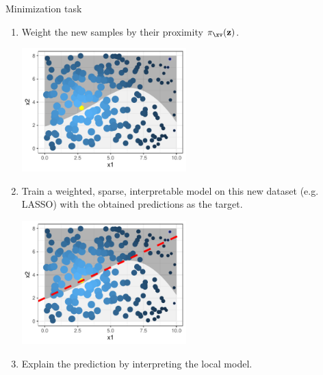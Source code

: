 \documentclass[11pt,compress,t,notes=noshow, xcolor=table]{beamer}
\newcommand{\neigh}{\pi_{\xv}}
\newcommand{\zv}{\mathbf{z}}
\begin{document}
\begin{vbframe}{Minimization task}
\begin{enumerate}
		\framebreak
		\item Weight the new samples by their proximity $\neigh(\zv)$.
			\vspace{1cm}
		\begin{center}
			\includegraphics[width=0.5\textwidth]{figure/lime4}
		\end{center}
		
		\framebreak
		\item Train a weighted, sparse, interpretable model on this new dataset (e.g. LASSO) with the obtained predictions as the target.
		
					\vspace{1cm}
		\begin{center}
			\includegraphics[width=0.5\textwidth]{figure/lime5}
		\end{center}
		
		\framebreak
		\item Explain the prediction by interpreting the local model. 
		\end{enumerate}
\framebreak



\end{vbframe}
\end{document}
